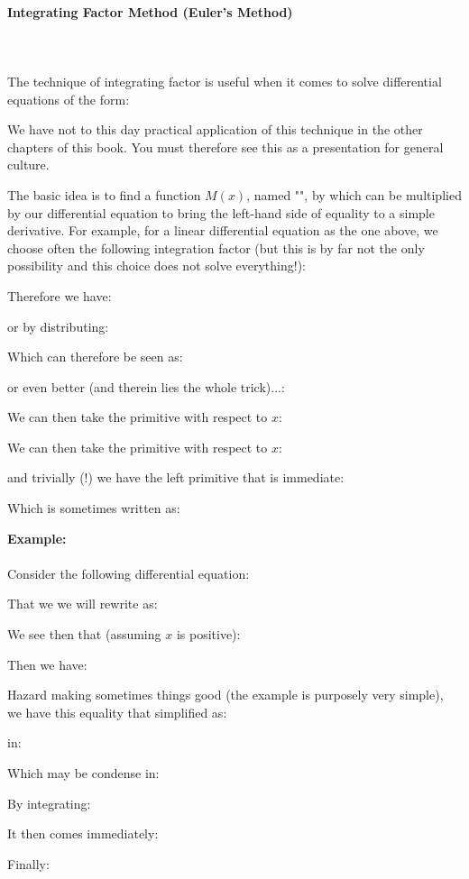 	
	\paragraph{Integrating Factor Method (Euler's Method)}\mbox{}\\\\
	The technique of integrating factor is useful when it comes to solve differential equations of the form:
	
	We have not to this day practical application of this technique in the other chapters of this book. You must therefore see this as a presentation for general culture.
	
	The basic idea is to find a function $M(x)$, named "", by which can be multiplied by our differential equation to bring the left-hand side of equality to a simple derivative. For example, for a linear differential equation as the one above, we choose often the following integration factor (but this is by far not the only possibility and this choice does not solve everything!):
	
	Therefore we have:
	
	or by distributing:
		
	Which can therefore be seen as:
	
	or even better (and therein lies the whole trick)...:
	
	We can then take the primitive with respect to $x$:
	
	We can then take the primitive with respect to $x$:
	
	and trivially (!) we have the left primitive that is immediate:
	
	Which is sometimes written as:
	
	\begin{tcolorbox}[colframe=black,colback=white,sharp corners]
	\textbf{{\Large {}}Example:}\\\\
	Consider the following differential equation:
	
	That we we will rewrite as:
	
	We see then that (assuming $x$ is positive):
	
	Then we have:
	
	Hazard making  sometimes things good (the example is purposely very simple), we have this equality that simplified as:
	
	in:
	
	Which may be condense in:
	
	By integrating:
	
	It then comes immediately:
	
	Finally:
	
	\end{tcolorbox}
	
